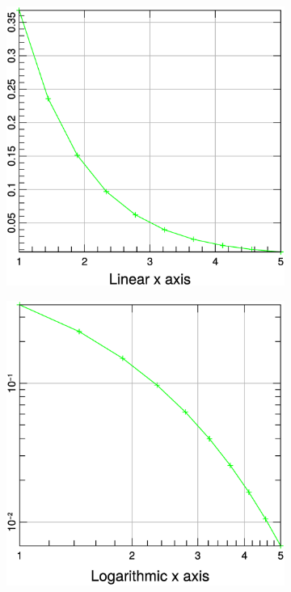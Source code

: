 \documentclass[a4paper]{article}
\begin{document}
\begin{figure}[h]
  \centering
  \begin{subfigure}[hb]{.32\linewidth}
    \includegraphics[width=\textwidth]{./examples_from_doc/xlabel/xlabel_1.eps}
  \end{subfigure}
  \hspace{2cm}
  \begin{subfigure}[hb]{.32\linewidth}
    \includegraphics[width=\textwidth]{./examples_from_doc/xlabel/xlabel_2.eps}
  \end{subfigure}
\end{figure}
\end{document}
